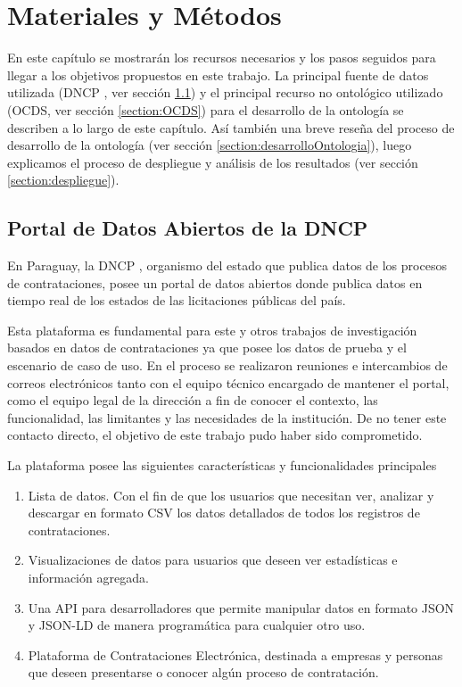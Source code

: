 \chapter{Materiales y Métodos}
\label{chap:MaterialesYMetodos}

En este capítulo se mostrarán los recursos necesarios y los pasos seguidos para llegar a los objetivos propuestos en este trabajo. La principal fuente de datos utilizada (DNCP \cite{DatosAbiDNCP:online}, ver sección \ref{section:portalDNCP}) y el principal recurso no ontológico utilizado (OCDS, ver sección \ref{section:OCDS}) para el desarrollo de la ontología se describen a lo largo de este capítulo. Así también una breve reseña del proceso de desarrollo de la ontología (ver sección \ref{section:desarrolloOntologia}), luego explicamos el proceso de despliegue y análisis de los resultados (ver sección \ref{section:despliegue}).

\section{Portal de Datos Abiertos de la DNCP}
\label{section:portalDNCP}

En Paraguay, la DNCP \cite{DatosAbiDNCP:online}, organismo del estado que publica datos de los procesos de contrataciones, posee un portal de datos abiertos donde publica datos en tiempo real de los estados de las licitaciones públicas del país. 

Esta plataforma es fundamental para este y otros trabajos de investigación basados en datos de contrataciones ya que posee los datos de prueba y el escenario de caso de uso. En el proceso se realizaron reuniones e intercambios de correos electrónicos tanto con el equipo técnico encargado de mantener el portal, como el equipo legal de la dirección a fin de conocer el contexto, las funcionalidad, las limitantes y las necesidades de la institución. De no tener este contacto directo, el objetivo de este trabajo pudo haber sido comprometido.

La plataforma posee las siguientes características y funcionalidades principales

\begin{enumerate}
    \item Lista de datos. Con el fin de que los usuarios que necesitan ver, analizar y descargar en formato CSV los datos detallados de todos los registros de contrataciones.
    \item Visualizaciones de datos para usuarios que deseen ver estadísticas e información agregada.
    \item Una API para desarrolladores que permite manipular datos en formato JSON y JSON-LD de manera programática para cualquier otro uso.
    \item Plataforma de Contrataciones Electrónica, destinada a empresas y personas que deseen presentarse o conocer algún proceso de contratación.
\end{enumerate}

